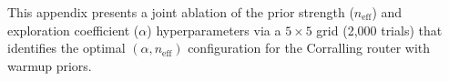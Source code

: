 \documentclass[10pt,letterpaper]{article}
\newcommand{\neff}{n_{\text{eff}}}
\begin{document}
This appendix presents a joint ablation of the prior strength ($\neff$)
and exploration coefficient ($\alpha$) hyperparameters via a
$5 \times 5$ grid (2,000 trials) that identifies the optimal
$(\alpha, \neff)$ configuration for the Corralling router with warmup
priors.



\end{document}
